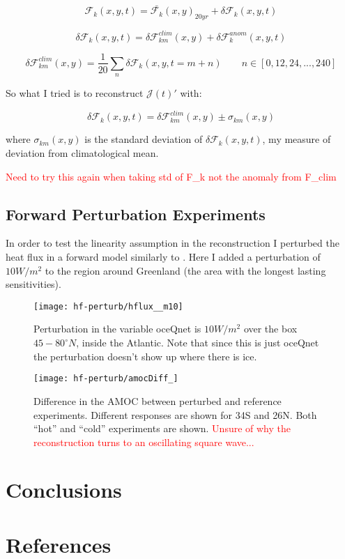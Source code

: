 \documentclass[a4paper,11pt]{article}
\newcommand{\red}[1]{\textcolor{red}{#1}}
\begin{document}
  \begin{equation}
	\mathcal{F}_k(x,y,t) = \bar{\mathcal{F}_k}(x,y)_{20yr} + \delta\mathcal{F}_k(x,y,t)
  \end{equation}

  \begin{equation}
	\delta\mathcal{F}_k(x,y,t) = \delta\mathcal{F}_{km}^{clim}(x,y) + \delta\mathcal{F}_{k}^{anom}(x,y,t)
  \end{equation}

  \begin{equation}
	\delta\mathcal{F}_{km}^{clim}(x,y) = \dfrac{1}{20}\sum_n\delta\mathcal{F}_k(x,y,t=m+n) \qquad n \in [0,12,24,...,240]
  \end{equation}

  So what I tried is to reconstruct $\mathcal{J}(t)'$ with:

  \begin{equation}
	\delta\mathcal{F}_k(x,y,t) = \delta\mathcal{F}_{km}^{clim}(x,y) \pm \sigma_{km}(x,y)	
  \end{equation}

  where $\sigma_{km}(x,y)$ is the standard deviation of $\delta\mathcal{F}_k(x,y,t)$, my measure of deviation from climatological mean. 

  \red{Need to try this again when taking std of F\_k not the anomaly from F\_clim}

  \subsection{Forward Perturbation Experiments} 

  In order to test the linearity assumption in the reconstruction I perturbed the heat flux in a forward model similarly to \cite{czeschelOscillatory}. Here I added a perturbation of $10 W/m^2$ to the region around Greenland (the area with the longest lasting sensitivities). 
  \begin{figure}
	\centering
	\texttt{[image: hf-perturb/hflux\_\_m10]}
	\caption{Perturbation in the variable oceQnet is $10 W/m^2$ over the box $45-80^{\circ}N$, inside the Atlantic. Note that since this is just oceQnet the perturbation doesn't show up where there is ice.}
	\label{fig:oceqnet_m10}
  \end{figure}

  \begin{figure}
	\centering
	\texttt{[image: hf-perturb/amocDiff\_]}
	\caption{Difference in the AMOC between perturbed and reference experiments. Different responses are shown for 34S and 26N. Both ``hot'' and ``cold'' experiments are shown. \red{Unsure of why the reconstruction turns to an oscillating square wave...}}
	\label{fig:amocDiff}
  \end{figure}

 \section{Conclusions}
 \label{conclusions}

  
\section{References}
\label{references}
{
}
\end{document}
